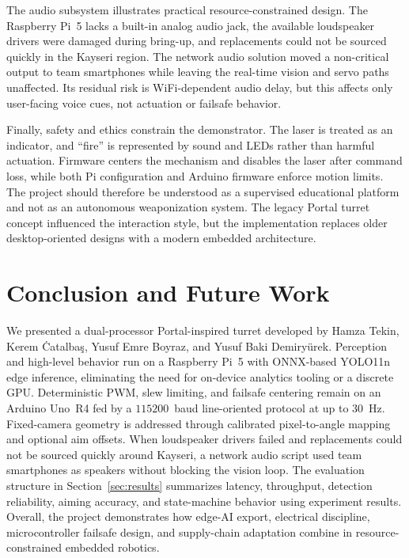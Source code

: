 \documentclass[lettersize,journal]{IEEEtran}
\begin{document}
The audio subsystem illustrates practical resource-constrained design. The Raspberry Pi~5 lacks a built-in analog audio jack, the available loudspeaker drivers were damaged during bring-up, and replacements could not be sourced quickly in the Kayseri region. The network audio solution moved a non-critical output to team smartphones while leaving the real-time vision and servo paths unaffected. Its residual risk is WiFi-dependent audio delay, but this affects only user-facing voice cues, not actuation or failsafe behavior.

Finally, safety and ethics constrain the demonstrator. The laser is treated as an indicator, and ``fire'' is represented by sound and LEDs rather than harmful actuation. Firmware centers the mechanism and disables the laser after command loss, while both Pi configuration and Arduino firmware enforce motion limits. The project should therefore be understood as a supervised educational platform and not as an autonomous weaponization system. The legacy Portal turret concept influenced the interaction style, but the implementation replaces older desktop-oriented designs with a modern embedded architecture.

\section{Conclusion and Future Work}
\label{sec:conclusion}
We presented a dual-processor Portal-inspired turret developed by Hamza Tekin, Kerem \.{C}atalba\c{s}, Yusuf Emre Boyraz, and Yusuf Baki Demiry\"{u}rek. Perception and high-level behavior run on a Raspberry Pi~5 with ONNX-based YOLO11n edge inference, eliminating the need for on-device analytics tooling or a discrete GPU. Deterministic PWM, slew limiting, and failsafe centering remain on an Arduino Uno~R4 fed by a $115200$~baud line-oriented protocol at up to $30$~Hz. Fixed-camera geometry is addressed through calibrated pixel-to-angle mapping and optional aim offsets. When loudspeaker drivers failed and replacements could not be sourced quickly around Kayseri, a network audio script used team smartphones as speakers without blocking the vision loop. The evaluation structure in Section~\ref{sec:results} summarizes latency, throughput, detection reliability, aiming accuracy, and state-machine behavior using experiment results. Overall, the project demonstrates how edge-AI export, electrical discipline, microcontroller failsafe design, and supply-chain adaptation combine in resource-constrained embedded robotics.
\end{document}
